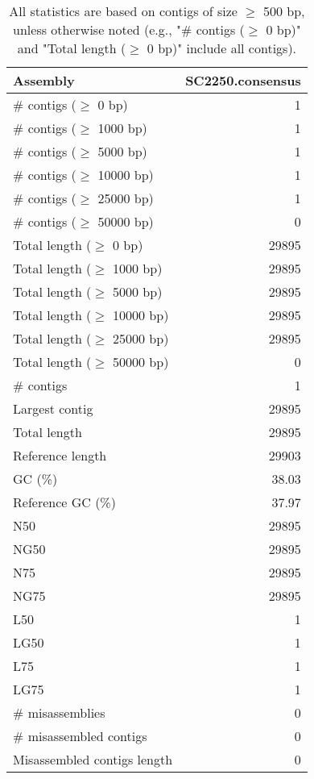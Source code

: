 \documentclass[12pt,a4paper]{article}
\begin{document}
\begin{table}[ht]
\begin{center}
\caption{All statistics are based on contigs of size $\geq$ 500 bp, unless otherwise noted (e.g., "\# contigs ($\geq$ 0 bp)" and "Total length ($\geq$ 0 bp)" include all contigs).}
\begin{tabular}{|l*{1}{|r}|}
\hline
Assembly & SC2250.consensus \\ \hline
\# contigs ($\geq$ 0 bp) & 1 \\ \hline
\# contigs ($\geq$ 1000 bp) & 1 \\ \hline
\# contigs ($\geq$ 5000 bp) & 1 \\ \hline
\# contigs ($\geq$ 10000 bp) & 1 \\ \hline
\# contigs ($\geq$ 25000 bp) & 1 \\ \hline
\# contigs ($\geq$ 50000 bp) & 0 \\ \hline
Total length ($\geq$ 0 bp) & 29895 \\ \hline
Total length ($\geq$ 1000 bp) & 29895 \\ \hline
Total length ($\geq$ 5000 bp) & 29895 \\ \hline
Total length ($\geq$ 10000 bp) & 29895 \\ \hline
Total length ($\geq$ 25000 bp) & 29895 \\ \hline
Total length ($\geq$ 50000 bp) & 0 \\ \hline
\# contigs & 1 \\ \hline
Largest contig & 29895 \\ \hline
Total length & 29895 \\ \hline
Reference length & 29903 \\ \hline
GC (\%) & 38.03 \\ \hline
Reference GC (\%) & 37.97 \\ \hline
N50 & 29895 \\ \hline
NG50 & 29895 \\ \hline
N75 & 29895 \\ \hline
NG75 & 29895 \\ \hline
L50 & 1 \\ \hline
LG50 & 1 \\ \hline
L75 & 1 \\ \hline
LG75 & 1 \\ \hline
\# misassemblies & 0 \\ \hline
\# misassembled contigs & 0 \\ \hline
Misassembled contigs length & 0 \\ \hline

\end{tabular}
\end{center}
\end{table}
\end{document}
